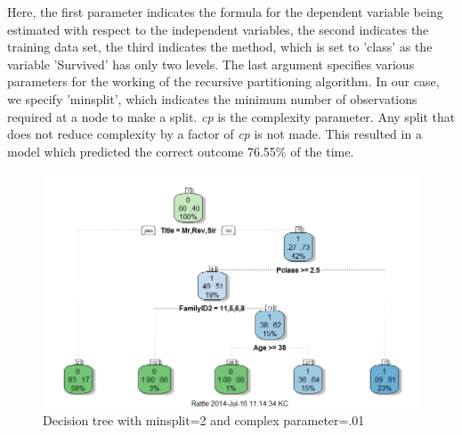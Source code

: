 \documentclass[a4paper,10pt]{report}\usepackage[]{graphicx}\usepackage[]{color}
\begin{document}
Here, the first parameter indicates the formula for the dependent variable being estimated with respect to the independent variables, the second indicates the training data set, the third indicates the method, which is set to 'class' as the variable 'Survived' has only two levels. The last argument specifies various parameters for the working of the recursive partitioning algorithm. In our case, we specify 'minsplit', which indicates the minimum number of observations required at a node to make a split. \emph{cp} is the complexity parameter. Any split that does not reduce complexity by a factor of \emph{cp} is not made. This resulted in a model which predicted the correct outcome 76.55\% of the time.
\begin{figure}[h]
  \includegraphics[width=\textwidth]{dt1}
  \caption{Decision tree with minsplit=2 and complex parameter=.01} \label{dt1}
\end{figure}
\end{document}
